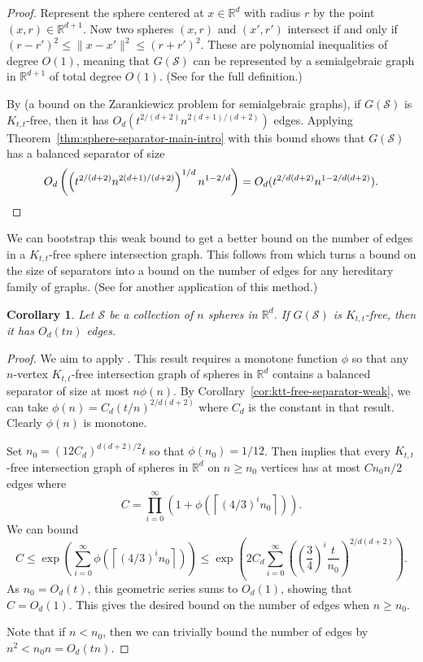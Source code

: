 \documentclass[11pt, reqno]{amsart}
\theoremstyle{plain}
\newtheorem{corollary}[theorem]{Corollary}
\theoremstyle{definition}
\theoremstyle{remark}
\numberwithin{theorem}{section}
\numberwithin{equation}{section}
\newcommand{\ceil}[1]{\left\lceil #1 \right\rceil}
\newcommand{\paren}[1]{\left( #1 \right)}
\newcommand{\R}{\mathbb R}
\newcommand{\fS}{\mathcal S}
\begin{document}
\begin{proof}
Represent the sphere centered at $x\in\R^d$ with radius $r$ by the point $(x,r)\in\R^{d+1}$. Now two spheres $(x,r)$ and $(x',r')$ intersect if and only if $(r-r')^2\leq\|x-x'\|^2\leq(r+r')^2$. These are polynomial inequalities of degree $O(1)$, meaning that $G(\fS)$ can be represented by a semialgebraic graph in $\R^{d+1}$ of total degree $O(1)$. (See \cite[Definition 1.1]{TY24} for the full definition.)

By \cite[Theorem 1.6]{TY24} (a bound on the Zarankiewicz problem for semialgebraic graphs), if $G(\fS)$ is $K_{t,t}$-free, then it has $O_d(t^{2/(d+2)}n^{2(d+1)/(d+2)})$ edges. Applying Theorem~\ref{thm:sphere-separator-main-intro} with this bound shows that $G(\fS)$ has a balanced separator of size
\[O_d\paren{\paren{t^{2/(d+2)}n^{2(d+1)/(d+2)}}^{1/d}n^{1-2/d}}=O_d(t^{2/d(d+2)}n^{1-2/d(d+2)}).\qedhere\]
\end{proof}

We can bootstrap this weak bound to get a better bound on the number of edges in a $K_{t,t}$-free sphere intersection graph. This follows from \cite[Lemma 8]{FP08} which turns a bound on the size of separators into a bound on the number of edges for any hereditary family of graphs. (See \cite[Section 3]{FP14} for another application of this method.)

\begin{corollary}
\label{cor:edge-bound-ktt-free}
Let $\fS$ be a collection of $n$ spheres in $\R^d$. If $G(\fS)$ is $K_{t,t}$-free, then it has $O_d(tn)$ edges.
\end{corollary}

\begin{proof}
We aim to apply \cite[Lemma 8]{FP08}. This result requires a monotone function $\phi$ so that any $n$-vertex $K_{t,t}$-free intersection graph of spheres in $\R^d$ contains a balanced separator of size at most $n\phi(n)$. By Corollary~\ref{cor:ktt-free-separator-weak}, we can take $\phi(n)=C_d(t/n)^{2/d(d+2)}$ where $C_d$ is the constant in that result. Clearly $\phi(n)$ is monotone.

Set $n_0=(12C_d)^{d(d+2)/2}t$ so that $\phi(n_0)=1/12$. Then \cite[Lemma 8]{FP08} implies that every $K_{t,t}$-free intersection graph of spheres in $\R^d$ on $n\geq n_0$ vertices has at most $Cn_0n/2$ edges where
\[C=\prod_{i=0}^\infty \paren{1+\phi\paren{\ceil{(4/3)^in_0}}}.\]
We can bound
\[C\leq\exp\paren{\sum_{i=0}^\infty \phi\paren{\ceil{(4/3)^in_0}}}\leq\exp\paren{2C_d\sum_{i=0}^\infty \paren{\paren{\frac34}^i\frac{t}{n_0}}^{2/d(d+2)}}.\]
As $n_0=O_d(t)$, this geometric series sums to $O_d(1)$, showing that $C=O_d(1)$. This gives the desired bound on the number of edges when $n\geq n_0$.

Note that if $n<n_0$, then we can trivially bound the number of edges by $n^2<n_0n=O_d(tn)$.
\end{proof}
\end{document}
